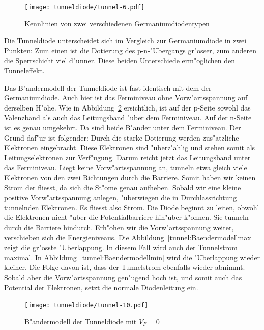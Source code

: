 \begin{refsection}
\begin{figure}	%
\centering
\texttt{[image: tunneldiode/tunnel-6.pdf]}
\caption{Kennlinien von zwei verschiedenen Germaniumdiodentypen
\label{tunnel:Germaniumdioden}}
\end{figure}

Die Tunneldiode unterscheidet sich im Vergleich zur Germaniumdiode in zwei Punkten:
Zum einen ist die Dotierung des p-n-"Ubergangs gr"osser, zum anderen die Sperrschicht viel d"unner. 
Diese beiden Unterschiede erm"oglichen den Tunneleffekt.

Das B"andermodell der Tunneldiode ist fast identisch mit dem der Germaniumdiode. 
Auch hier ist das Ferminiveau ohne Vorw"artsspannung auf derselben H"ohe. 
Wie in Abbildung~\ref{tunnel:Baendermodell0} ersichtlich, ist auf der p-Seite sowohl das Valenzband als auch das Leitungsband "uber dem Ferminiveau. 
Auf der n-Seite ist es genau umgekehrt. 
Da sind beide B"ander unter dem Ferminiveau.
Der Grund daf"ur ist folgender:
Durch die starke Dotierung werden zus"atzliche Elektronen eingebracht.
Diese Elektronen sind "uberz"ahlig und stehen somit als Leitungselektronen zur Verf"ugung.
Darum reicht jetzt das Leitungsband unter das Ferminiveau.
Liegt keine Vorw"artsspannung an, tunneln etwa gleich viele Elektronen von den zwei Richtungen durch die Barriere.
Somit haben wir keinen Strom der fliesst, da sich die St"ome genau aufheben.
Sobald wir eine kleine positive Vorw"artsspannung anlegen, "uberwiegen die in Durchlassrichtung tunnelnden Elektronen.
Es fliesst also Strom.
Die Diode beginnt zu leiten, obwohl die Elektronen nicht "uber die Potentialbarriere hin"uber k"onnen. 
Sie tunneln durch die Barriere hindurch.
Erh"ohen wir die Vorw"artsspannung weiter, verschieben sich die Energieniveaus.
Die Abbildung~\ref{tunnel:Baendermodellmax} zeigt die gr"osste "Uberlappung. 
In diesem Fall wird auch der Tunnelstrom maximal. 
In Abbildung~\ref{tunnel:Baendermodellmin} wird die "Uberlappung wieder kleiner. 
Die Folge davon ist, dass der Tunnelstrom ebenfalls wieder abnimmt.
%
Sobald aber die Vorw"artsspannung gen"ugend hoch ist, und somit auch das Potential der Elektronen, setzt die normale Diodenleitung ein.

\begin{figure}	%
\centering
\texttt{[image: tunneldiode/tunnel-10.pdf]}
\caption{B"andermodell der Tunneldiode mit $V_F = 0$
\label{tunnel:Baendermodell0}}


\end{figure}
\end{refsection}
